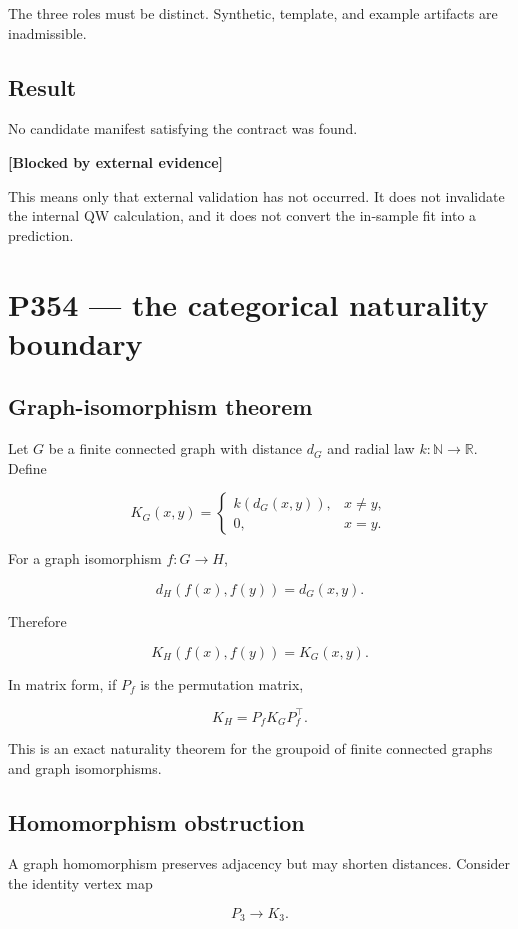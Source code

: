 \documentclass[11pt,a4paper,openany]{report}
\begin{document}
The three roles must be distinct. Synthetic, template, and example artifacts are inadmissible.

\section{Result}

No candidate manifest satisfying the contract was found.

\textbf{[Blocked by external evidence]}

This means only that external validation has not occurred. It does not invalidate the internal QW calculation, and it does not convert the in-sample fit into a prediction.

\chapter{P354 --- the categorical naturality boundary}

\section{Graph-isomorphism theorem}

Let \(G\) be a finite connected graph with distance \(d_G\) and radial law \(k:\mathbb N\to\mathbb R\). Define

\[
K_G(x,y)=
\begin{cases}
k(d_G(x,y)),&x\ne y,\\
0,&x=y.
\end{cases}
\]

For a graph isomorphism \(f:G\to H\),

\[
d_H(f(x),f(y))=d_G(x,y).
\]

Therefore

\[
K_H(f(x),f(y))=K_G(x,y).
\]

In matrix form, if \(P_f\) is the permutation matrix,

\[
K_H=P_fK_GP_f^\top.
\]

This is an exact naturality theorem for the groupoid of finite connected graphs and graph isomorphisms.

\section{Homomorphism obstruction}

A graph homomorphism preserves adjacency but may shorten distances. Consider the identity vertex map

\[
P_3\longrightarrow K_3.
\]
\end{document}
